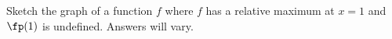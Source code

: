 {Sketch the graph of a function $f$ where $f$ has a relative maximum at $x=1$ and $\fp(1)$ is undefined.
}
{Answers will vary.
}
